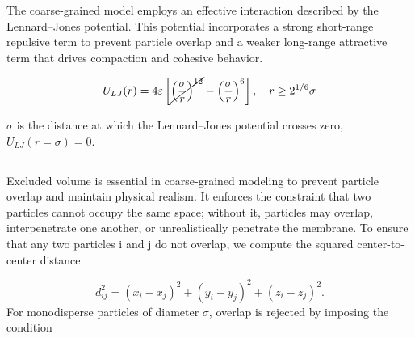 \documentclass[12pt]{article}
\begin{document}
\begin{flushleft}
          \indent The coarse-grained model employs an effective interaction described by the Lennard–Jones potential. This potential incorporates a strong short-range repulsive term to prevent particle overlap and a weaker long-range attractive term that drives compaction and cohesive behavior.

\begin{equation}
U_{LJ}(r) = 4\varepsilon \left[ \cancel{\left( \frac{\sigma}{r} \right)^{12}}
- \left( \frac{\sigma}{r} \right)^{6} \right], \quad r \ge 2^{1/6}\sigma
\end{equation}
    

$\sigma$ is the distance at which the Lennard--Jones potential crosses zero, $U_{LJ}(r=\sigma)=0$.



  \subsection*{}
Excluded volume is essential in coarse-grained modeling to prevent particle overlap and maintain physical realism. It enforces the constraint that two particles cannot occupy the same space; without it, particles may overlap, interpenetrate one another, or unrealistically penetrate the membrane. To ensure that any two particles 
i and j do not overlap, we compute the squared center-to-center distance

\begin{equation}
d_{ij}^2 = (x_i - x_j)^2 + (y_i - y_j)^2 + (z_i - z_j)^2.
\end{equation}
For monodisperse particles of diameter $\sigma$, overlap is rejected by imposing the condition


\end{flushleft}
\end{document}
